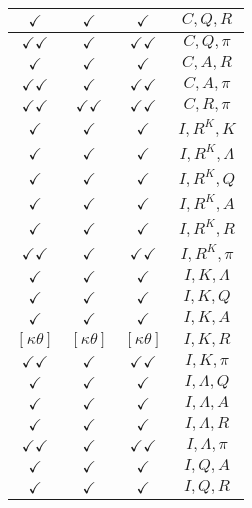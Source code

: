 \documentclass[a4paper,10pt]{article}
\begin{document}
\begin{longtable}{|c|c|c|c|}
\hline
$\checkmark$ & $\checkmark$ & $\checkmark$ & ${C},{Q},{R}$ \\
\hline
$\checkmark\checkmark$ & $\checkmark$ & $\checkmark\checkmark$ & ${C},{Q},{\pi}$ \\
\hline
$\checkmark$ & $\checkmark$ & $\checkmark$ & ${C},{A},{R}$ \\
\hline
$\checkmark\checkmark$ & $\checkmark$ & $\checkmark\checkmark$ & ${C},{A},{\pi}$ \\
\hline
$\checkmark\checkmark$ & $\checkmark\checkmark$ & $\checkmark\checkmark$ & ${C},{R},{\pi}$ \\
\hline
$\checkmark$ & $\checkmark$ & $\checkmark$ & ${I},{R^{K}},{K}$ \\
\hline
$\checkmark$ & $\checkmark$ & $\checkmark$ & ${I},{R^{K}},{\Lambda}$ \\
\hline
$\checkmark$ & $\checkmark$ & $\checkmark$ & ${I},{R^{K}},{Q}$ \\
\hline
$\checkmark$ & $\checkmark$ & $\checkmark$ & ${I},{R^{K}},{A}$ \\
\hline
$\checkmark$ & $\checkmark$ & $\checkmark$ & ${I},{R^{K}},{R}$ \\
\hline
$\checkmark\checkmark$ & $\checkmark$ & $\checkmark\checkmark$ & ${I},{R^{K}},{\pi}$ \\
\hline
$\checkmark$ & $\checkmark$ & $\checkmark$ & ${I},{K},{\Lambda}$ \\
\hline
$\checkmark$ & $\checkmark$ & $\checkmark$ & ${I},{K},{Q}$ \\
\hline
$\checkmark$ & $\checkmark$ & $\checkmark$ & ${I},{K},{A}$ \\
\hline
$[\kappa \theta ]$ & $[\kappa \theta ]$ & $[\kappa \theta ]$ & ${I},{K},{R}$ \\
\hline
$\checkmark\checkmark$ & $\checkmark$ & $\checkmark\checkmark$ & ${I},{K},{\pi}$ \\
\hline
$\checkmark$ & $\checkmark$ & $\checkmark$ & ${I},{\Lambda},{Q}$ \\
\hline
$\checkmark$ & $\checkmark$ & $\checkmark$ & ${I},{\Lambda},{A}$ \\
\hline
$\checkmark$ & $\checkmark$ & $\checkmark$ & ${I},{\Lambda},{R}$ \\
\hline
$\checkmark\checkmark$ & $\checkmark$ & $\checkmark\checkmark$ & ${I},{\Lambda},{\pi}$ \\
\hline
$\checkmark$ & $\checkmark$ & $\checkmark$ & ${I},{Q},{A}$ \\
\hline
$\checkmark$ & $\checkmark$ & $\checkmark$ & ${I},{Q},{R}$ \\

\end{longtable}
\end{document}
